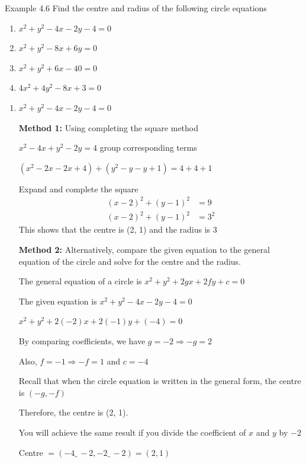 \begin{example}{Example 4.6}
Find the centre and radius of the following circle equations
\begin{enumerate}
  \item[a.] $x^2 + y^2 - 4x - 2y - 4 = 0$
  \item[b.] $x^2 + y^2 - 8x + 6y = 0$
  \item[c.] $x^2 + y^2 + 6x - 40 = 0$
  \item[d.] $4x^2 + 4y^2 - 8x + 3 = 0$
\end{enumerate}

\solution
\begin{enumerate}
  \item[a.] $x^2 + y^2 - 4x - 2y - 4 = 0$

  \textbf{Method 1:} Using completing the square method

  $x^2 - 4x + y^2 - 2y = 4$ group corresponding terms

  $(x^2 - 2x - 2x + 4) + (y^2 - y - y + 1) = 4 + 4 + 1$

  Expand and complete the square
  \begin{align*}
  (x - 2)^2 + (y - 1)^2 &= 9 \\
  (x - 2)^2 + (y - 1)^2 &= 3^2
  \end{align*}
  This shows that the centre is (2, 1) and the radius is 3

  \textbf{Method 2:} Alternatively, compare the given equation to the general equation
  of the circle and solve for the centre and the radius.

  The general equation of a circle is $x^2 + y^2 + 2gx + 2fy + c = 0$

  The given equation is $x^2 + y^2 - 4x - 2y - 4 = 0$

  $x^2 + y^2 + 2(-2)x + 2(-1)y + (-4) = 0$

  By comparing coefficients, we have $g = -2 \Longrightarrow -g = 2$

  Also, $f = -1 \Longrightarrow -f = 1$ and $c = -4$

  Recall that when the circle equation is written in the general form, the centre
  is $(-g, -f)$

  Therefore, the centre is (2, 1).

  You will achieve the same result if you divide the coefficient of $x$ and $y$ by $-2$

  Centre $= (-4 \_\, -2, -2 \_\, -2) = (2, 1)$


\end{enumerate}
\end{example}
